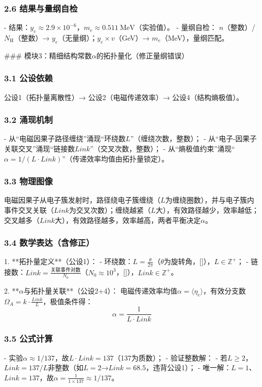 \documentclass{article}
\begin{document}
\subsubsection{2.6 结果与量纲自检}
- 结果：\(y_e≈2.9×10^{-6}\)，\(m_e≈0.511\ \text{MeV}\)（实验值）。  
- 量纲自检：  
  \(n\)（整数）/\(N_{\text{H}}\)（整数）→ \(y_e\)（无量纲）；\(y_e×v\)（GeV）→ \(m_e\)（MeV），量纲匹配。


### 模块3：精细结构常数\(\alpha\)的拓扑量化（修正量纲错误）
\subsubsection{3.1 公设依赖}
公设1（拓扑量离散性）→ 公设2（电磁传递效率）→ 公设4（结构熵极值）。

\subsubsection{3.2 涌现机制}
- 从“电磁因果子路径缠绕”涌现“环绕数\(L\)”（缠绕次数，整数）；  
- 从“电子-因果子关联交叉”涌现“链接数\(Link\)”（交叉次数，整数）；  
- 从“熵极值约束”涌现“\(\alpha=1/(L·Link)\)”（传递效率均值由拓扑量锁定）。

\subsubsection{3.3 物理图像}
电磁因果子从电子簇发射时，路径绕电子簇缠绕（\(L\)为缠绕圈数），并与电子簇内事件交叉关联（\(Link\)为交叉次数）；缠绕越紧（\(L\)大），有效路径越少，效率越低；交叉越多（\(Link\)大），有效路径越多，效率越高，两者平衡决定\(\alpha\)。

\subsubsection{3.4 数学表达（含修正）}
1. **拓扑量定义**（公设1）：  
   - 环绕数：\(L = \frac{\theta}{2\pi}\)（\(\theta\)为旋转角，[]），\(L \in \mathbb{Z}^+\)；  
   - 链接数：\(Link = \frac{\text{关联事件对数}}{N_0}\)（\(N_0≈10^3\)，[]），\(Link \in \mathbb{Z}^+\)。

2. **\(\alpha\)与拓扑量关联**（公设2+4）：  
   电磁传递效率均值\(\alpha = \langle \eta_e \rangle\)，有效分支数\(\Omega_A = k \cdot \frac{Link}{L}\)，极值条件得：  
   \[
   \alpha = \frac{1}{L \cdot Link}
   \]

\subsubsection{3.5 公式计算}
- 实验\(\alpha≈1/137\)，故\(L·Link=137\)（137为质数）；  
- 验证整数解：  
  - 若\(L≥2\)，\(Link=137/L\)非整数（如\(L=2\)→\(Link=68.5\)，违背公设1）；  
  - 唯一解：\(L=1\)、\(Link=137\)，故\(\alpha = \frac{1}{1×137} ≈ 1/137\)。
\end{document}
